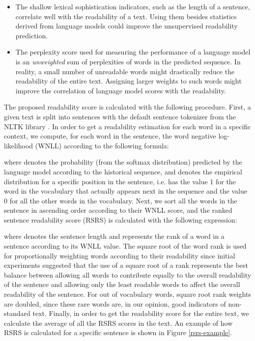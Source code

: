 \documentclass{clv3}
\begin{document}
\begin{itemize}
\item The shallow lexical sophistication indicators, such as the length of a sentence, correlate well with the readability of a text. Using them besides statistics derived from language models could improve the unsupervised readability prediction. 
\item The perplexity score used for measuring the performance of a language model is an \emph{unweighted} sum of perplexities of words in the predicted sequence. In reality, a small number of unreadable words might drastically reduce the readability of the entire text. Assigning larger weights to such words might improve the correlation of language model scores with the readability.
\end{itemize}

The proposed readability score is calculated with the following procedure. First, a given text is split into sentences with the default sentence tokenizer from the NLTK library \citep{bird2004nltk}. In order to get a readability estimation for each word in a specific context, we compute, for each word in the sentence, the word negative log-likelihood (WNLL) according to the following formula:


\noindent
where  denotes the probability (from the softmax distribution) predicted by the language model according to the historical sequence, and  denotes the empirical distribution for a specific position in the sentence, i.e.  has the value 1 for the word in the vocabulary that actually appears next in the sequence and the value 0 for all the other words in the vocabulary. Next, we sort all the words in the sentence in ascending order according to their WNLL score, and the ranked sentence readability score (RSRS) is calculated with the following expression:

\noindent
where  denotes the sentence length and  represents the rank of a word in a sentence according to its WNLL value. The square root of the word rank is used for proportionally weighting words according to their readability since initial experiments suggested that the use of a square root of a rank represents the best balance between allowing all words to contribute equally to the overall readability of the sentence and allowing only the least readable words to affect the overall readability of the sentence. For out of vocabulary words, square root rank weights are doubled, since these rare words are, in our opinion, good indicators of non-standard text. Finally, in order to get the readability score for the entire text, we calculate the average of all the RSRS scores in the text. An example of how RSRS is calculated for a specific sentence is shown in Figure \ref{rsrs-example}. 
\end{document}
